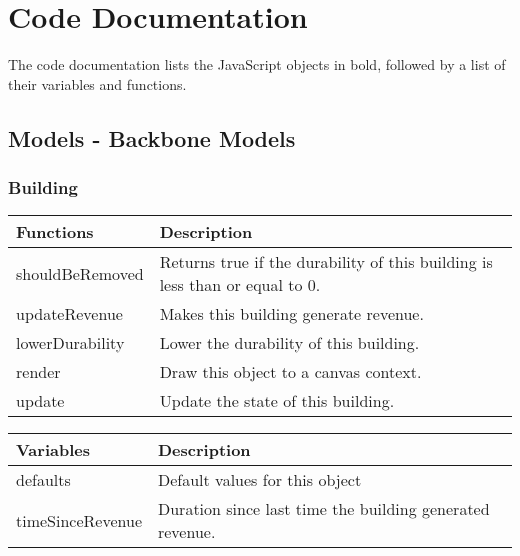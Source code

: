 \chapter{Code Documentation}

The code documentation lists the JavaScript objects in bold, followed by a list of their variables and functions.

\clearpage 

\section{Models - Backbone Models}

\subsection*{Building}
	\begin{table}[H]
	\begin{tabular}{p{4cm} | p{8cm} }
	\hline
	\rowcolor{gray}
	Functions & Description \\ \hline
	shouldBeRemoved & Returns true if the durability of this building is less than or equal to 0. \\ \hline
	updateRevenue & Makes this building generate revenue. \\ \hline
	lowerDurability & Lower the durability of this building. \\ \hline
	render & Draw this object to a canvas context. \\ \hline
	update & Update the state of this building. \\ \hline
	\end{tabular}
	\end{table}

	\begin{table}[H]
	\begin{tabular}{p{4cm} | p{8cm} }
	\hline
	\rowcolor{gray}
	Variables & Description \\ \hline
	defaults & Default values for this object \\ \hline
	timeSinceRevenue & Duration since last time the building generated revenue. \\ \hline

	\end{tabular}
	\end{table}

